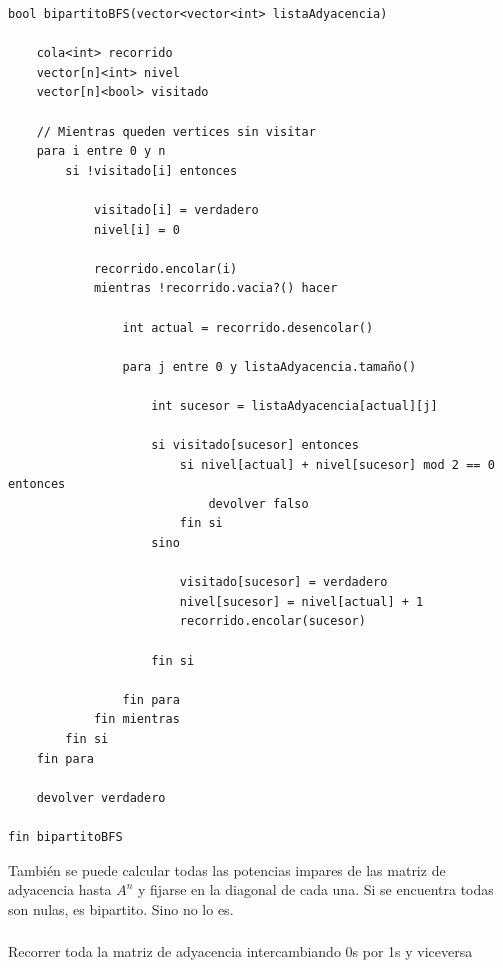\begin{codesnippet}
\begin{verbatim}
bool bipartitoBFS(vector<vector<int> listaAdyacencia)

    cola<int> recorrido
    vector[n]<int> nivel
    vector[n]<bool> visitado

    // Mientras queden vertices sin visitar
    para i entre 0 y n
        si !visitado[i] entonces

            visitado[i] = verdadero
            nivel[i] = 0

            recorrido.encolar(i)
            mientras !recorrido.vacia?() hacer

                int actual = recorrido.desencolar()

                para j entre 0 y listaAdyacencia.tamaño()

                    int sucesor = listaAdyacencia[actual][j]

                    si visitado[sucesor] entonces
                        si nivel[actual] + nivel[sucesor] mod 2 == 0 entonces
                            devolver falso
                        fin si
                    sino

                        visitado[sucesor] = verdadero
                        nivel[sucesor] = nivel[actual] + 1
                        recorrido.encolar(sucesor)

                    fin si

                fin para
            fin mientras
        fin si
    fin para

    devolver verdadero

fin bipartitoBFS
\end{verbatim}
\end{codesnippet}

También se puede calcular todas las potencias impares de las matriz de adyacencia hasta $A^n$ y fijarse en la diagonal de cada una. Si se encuentra todas son nulas, es bipartito. Sino no lo es.

\subsubsection{}
Recorrer toda la matriz de adyacencia intercambiando 0s por 1s y viceversa

\subsubsection{}


